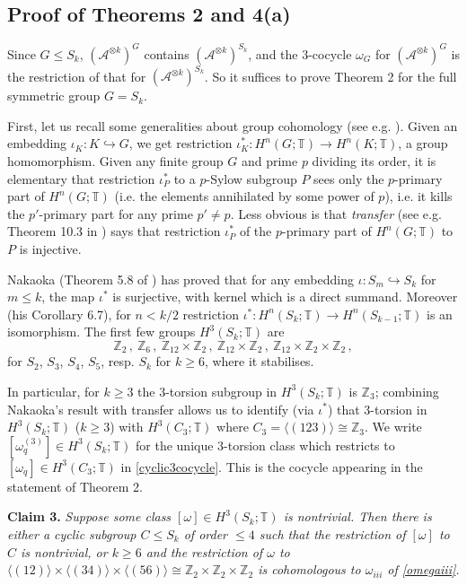 \documentclass[12pt]{article}
\numberwithin{equation}{section}
\def\cA            {{\mathcal{A}}}
\def\bbT           {\mathbb{T}}
\def\bbZ           {\mathbb{Z}}
\begin{document}
\subsection{Proof of Theorems 2 and 4(a)} 


Since $G\le S_k$, $(\cA^{\otimes k})^G$ contains $(\cA^{\otimes k})^{S_k}$, and the 3-cocycle $\omega_G$ for $(\cA^{\otimes k})^G$ is the restriction of that for 
$(\cA^{\otimes k})^{S_k}$. So it suffices to prove Theorem 2 for the full symmetric group $G=S_k$.

First, let us recall some generalities about group cohomology (see e.g. \cite{Brown}). 
Given an embedding $\iota_K:K\hookrightarrow G$, we get restriction
$\iota_K^*:H^n(G;\bbT)\rightarrow H^n(K;\bbT)$, a group homomorphism.
Given any finite group $G$ and prime $p$ dividing its order, it is elementary that restriction $\iota_P^*$ to a $p$-Sylow subgroup $P$ sees only the $p$-primary part of $H^n(G;\bbT)$ (i.e. the elements annihilated by some power of $p$), i.e. it kills the $p'$-primary part for any prime $p'\ne p$. Less obvious is that \textit{transfer} (see e.g. Theorem 10.3 in \cite{Brown}) says that restriction $\iota_P^*$ of the $p$-primary part of $H^n(G;\bbT)$ to $P$ is injective. 

Nakaoka  (Theorem 5.8 of \cite{Nak}) has proved that for any embedding $\iota:S_m\hookrightarrow S_k$ for $m\le k$, the map
$\iota^*$ is surjective, with kernel which is a direct summand.  Moreover (his Corollary 6.7), for $n<k/2$
restriction $\iota^*:H^n(S_k;\bbT)\rightarrow H^n({S_{k-1}};\bbT)$ is an isomorphism. The first few groups $H^3(S_k;\bbT)$ are
$$\bbZ_2\,,\ \bbZ_6\,,\ \bbZ_{12}\times \bbZ_2\,,\ \bbZ_{12}\times \bbZ_2\,,\ \bbZ_{12}\times \bbZ_2\times\bbZ_2\,,%
$$
for $S_2$, $S_3$, $S_4$, $S_5$, resp. $S_k$ for $k\ge 6$, where it stabilises.



In particular, for $k\ge 3$ the 3-torsion subgroup in $H^3(S_k;\bbT)$ is $\bbZ_3$; combining Nakaoka's result with transfer allows us to identify (via $\iota^*$) that 3-torsion in $H^3(S_k;\bbT)$ ($k\ge 3$) with $H^3(C_3;\bbT)$ where
$C_3=\langle(123)\rangle\cong\bbZ_3$. We write $[\omega^{(3)}_q]\in H^3(S_k;\bbT)$ for the unique 3-torsion class which restricts to $[\omega_q]\in H^3(C_3;\bbT)$ in \eqref{cyclic3cocycle}. This is the cocycle appearing in the statement of Theorem 2.

\medskip\noindent\textbf{Claim 3.} \textit{Suppose some class $[\omega]\in H^3(S_k;\bbT)$ is nontrivial. Then there is either a cyclic subgroup 
$C\le S_k$ of order $\le 4$ such that the restriction of $[\omega]$ to $C$ is nontrivial, or $k\ge 6$ and the restriction of
$\omega$ to  $\langle (12)\rangle\times\langle(34)\rangle\times\langle(56)\rangle\cong \bbZ_2\times\bbZ_2\times\bbZ_2$ is cohomologous to $\omega_{iii}$ of \eqref{omegaiii}.}\medskip
\end{document}
